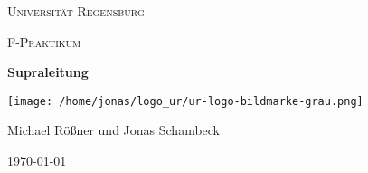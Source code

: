 \begin{titlepage}
	\centering
	{\scshape \LARGE Universität Regensburg \par}
	\vspace{1cm}
	{\scshape\Large F-Praktikum\par}
	\vspace{1.5cm}
	{\huge\bfseries Supraleitung\par}
	\vspace{2cm}
	\texttt{[image: /home/jonas/logo\_ur/ur-logo-bildmarke-grau.png]}\par
	\vfill
	{\large Michael Rößner und Jonas Schambeck\par}

	\vfill

	{\large \today\par}
\end{titlepage}
